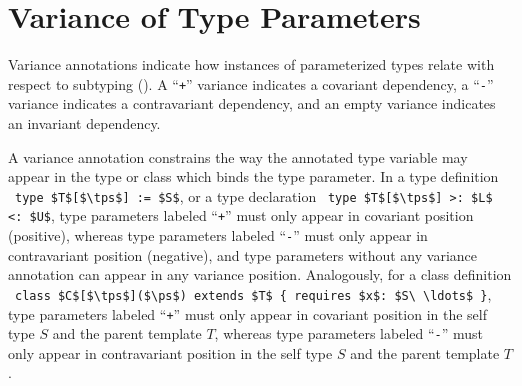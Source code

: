 \section{Variance of Type Parameters}
\label{sec:variance-of-type-parameters}

Variance annotations indicate how instances of parameterized types relate with respect to subtyping (). A ``\lstinline!+!'' variance indicates a covariant dependency, a ``\lstinline!-!'' variance indicates a contravariant dependency, and an empty variance indicates an invariant dependency. 

A variance annotation constrains the way the annotated type variable may appear in the type or class which binds the type parameter. In a type definition ~\lstinline!type $T$[$\tps$] := $S$!, or a type declaration ~\lstinline!type $T$[$\tps$] >: $L$ <: $U$!, type parameters labeled ``\lstinline!+!'' must only appear in covariant position (positive), whereas type parameters labeled ``\lstinline!-!'' must only appear in contravariant position (negative), and type parameters without any variance annotation can appear in any variance position. Analogously, for a class definition ~\lstinline!class $C$[$\tps$]($\ps$) extends $T$ { requires $x$: $S\ \ldots$ }!, type parameters labeled ``\lstinline!+!'' must only appear in covariant position in the self type $S$ and the parent template $T$, whereas type parameters labeled ``\lstinline!-!'' must only appear in contravariant position in the self type $S$ and the parent template $T$.

